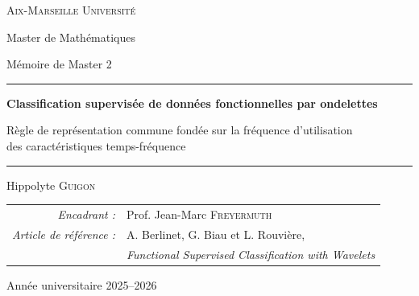 \begin{titlepage}
\centering
{\large\scshape Aix-Marseille Université\par}
\vspace{0.2cm}
{\normalsize Master de Mathématiques\par}
\vspace{0.1cm}
{\normalsize Mémoire de Master 2\par}

\vspace{3cm}
\rule{\linewidth}{0.6pt}\par
\vspace{0.5cm}
{\LARGE\bfseries\color{bleuamu} Classification supervisée de données fonctionnelles par ondelettes\par}
\vspace{0.4cm}
{\large Règle de représentation commune fondée sur la fréquence d'utilisation\\ des caractéristiques temps-fréquence\par}
\vspace{0.5cm}
\rule{\linewidth}{0.6pt}\par

\vspace{2.5cm}
{\Large Hippolyte \textsc{Guigon}\par}

\vfill
\begin{tabular}{rl}
\textit{Encadrant :} & Prof. Jean-Marc \textsc{Freyermuth} \\[2pt]
\textit{Article de référence :} & A. Berlinet, G. Biau et L. Rouvière,\\
& \emph{Functional Supervised Classification with Wavelets}
\end{tabular}

\vspace{1.5cm}
{\normalsize Année universitaire 2025--2026\par}
\end{titlepage}
\cleardoublepage
